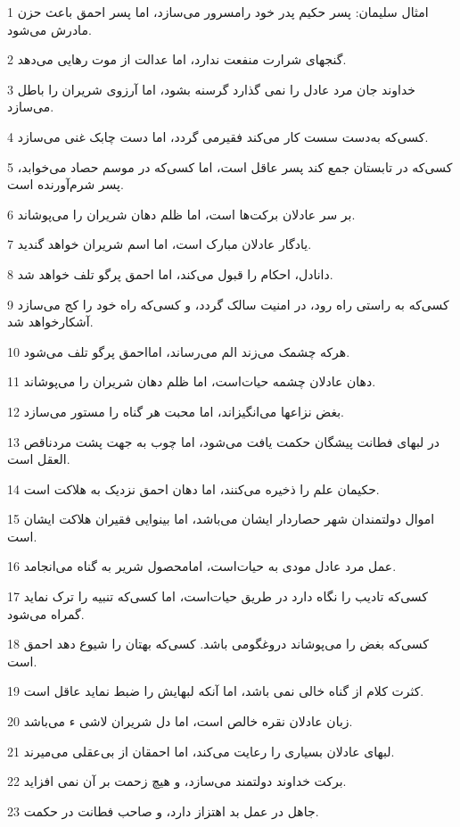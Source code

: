 \par 1 امثال سلیمان: پسر حکیم پدر خود رامسرور می‌سازد، اما پسر احمق باعث حزن مادرش می‌شود.
\par 2 گنجهای شرارت منفعت ندارد، اما عدالت از موت رهایی می‌دهد.
\par 3 خداوند جان مرد عادل را نمی گذارد گرسنه بشود، اما آرزوی شریران را باطل می‌سازد.
\par 4 کسی‌که به‌دست سست کار می‌کند فقیرمی گردد، اما دست چابک غنی می‌سازد.
\par 5 کسی‌که در تابستان جمع کند پسر عاقل است، اما کسی‌که در موسم حصاد می‌خوابد، پسر شرم‌آورنده است.
\par 6 بر سر عادلان برکت‌ها است، اما ظلم دهان شریران را می‌پوشاند.
\par 7 یادگار عادلان مبارک است، اما اسم شریران خواهد گندید.
\par 8 دانادل، احکام را قبول می‌کند، اما احمق پرگو تلف خواهد شد.
\par 9 کسی‌که به راستی راه رود، در امنیت سالک گردد، و کسی‌که راه خود را کج می‌سازد آشکارخواهد شد.
\par 10 هر‌که چشمک می‌زند الم می‌رساند، امااحمق پرگو تلف می‌شود.
\par 11 دهان عادلان چشمه حیات‌است، اما ظلم دهان شریران را می‌پوشاند.
\par 12 بغض نزاعها می‌انگیزاند، اما محبت هر گناه را مستور می‌سازد.
\par 13 در لبهای فطانت پیشگان حکمت یافت می‌شود، اما چوب به جهت پشت مردناقص العقل است.
\par 14 حکیمان علم را ذخیره می‌کنند، اما دهان احمق نزدیک به هلاکت است.
\par 15 اموال دولتمندان شهر حصاردار ایشان می‌باشد، اما بینوایی فقیران هلاکت ایشان است.
\par 16 عمل مرد عادل مودی به حیات‌است، امامحصول شریر به گناه می‌انجامد.
\par 17 کسی‌که تادیب را نگاه دارد در طریق حیات‌است، اما کسی‌که تنبیه را ترک نماید گمراه می‌شود.
\par 18 کسی‌که بغض را می‌پوشاند دروغگومی باشد. کسی‌که بهتان را شیوع دهد احمق است.
\par 19 کثرت کلام از گناه خالی نمی باشد، اما آنکه لبهایش را ضبط نماید عاقل است.
\par 20 زبان عادلان نقره خالص است، اما دل شریران لاشی ء می‌باشد.
\par 21 لبهای عادلان بسیاری را رعایت می‌کند، اما احمقان از بی‌عقلی می‌میرند.
\par 22 برکت خداوند دولتمند می‌سازد، و هیچ زحمت بر آن نمی افزاید.
\par 23 جاهل در عمل بد اهتزاز دارد، و صاحب فطانت در حکمت.

